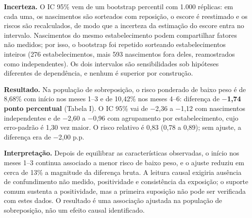 \documentclass[10pt,a4paper]{article}
\newcommand{\menos}{\ensuremath{-}}
\begin{document}
{\color{iptescuro}\bfseries Incerteza.} O IC 95\% vem de um bootstrap percentil com 1.000 réplicas: em cada uma, os nascimentos são sorteados com reposição, o escore é reestimado e os riscos são recalculados, de modo que a incerteza da estimação do escore entra no intervalo. Nascimentos do mesmo estabelecimento podem compartilhar fatores não medidos; por isso, o bootstrap foi repetido sorteando estabelecimentos inteiros (276 estabelecimentos, mais 593 nascimentos fora deles, reamostrados como independentes). Os dois intervalos são sensibilidades sob hipóteses diferentes de dependência, e nenhum é superior por construção.\par

{\color{iptescuro}\bfseries Resultado.} Na população de sobreposição, o risco ponderado de baixo peso é de 8,68\% com início nos meses 1--3 e de 10,42\% nos meses 4--6: diferença de \textbf{\menos{}1,74 ponto percentual} (Tabela I). O IC 95\% vai de \menos{}2,36 a \menos{}1,12 com nascimentos independentes e de \menos{}2,60 a \menos{}0,96 com agrupamento por estabelecimento, cujo erro-padrão é 1,30 vez maior. O risco relativo é 0,83 (0,78 a 0,89); sem ajuste, a diferença era de \menos{}2,00 p.p.\par

{\color{iptescuro}\bfseries Interpretação.} Depois de equilibrar as características observadas, o início nos meses 1--3 continua associado a menor risco de baixo peso, e o ajuste reduziu em cerca de 13\% a magnitude da diferença bruta. A leitura causal exigiria ausência de confundimento não medido, positividade e consistência da exposição; o suporte comum sustenta a positividade, mas a primeira suposição não pode ser verificada com estes dados. O resultado é uma associação ajustada na população de sobreposição, não um efeito causal identificado.\par
\end{document}
